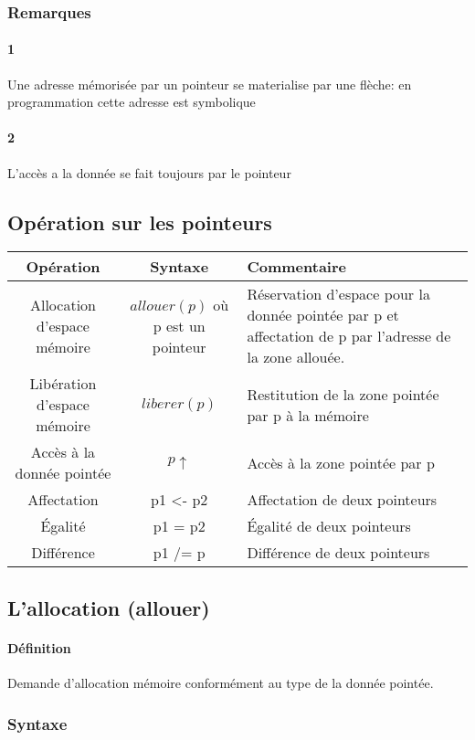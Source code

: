 		\subsubsection{Remarques}
			\paragraph{1}Une adresse mémorisée par un pointeur se materialise par une flèche: en programmation cette adresse est symbolique
			\paragraph{2}L'accès a la donnée se fait toujours par le pointeur		
	\subsection{Opération sur les pointeurs}
		\begin{tabular}{|c|c|p{6cm}|}
			\hline
				\textbf{Opération} & \textbf{Syntaxe} & \textbf{Commentaire} \\
			\hline
				Allocation d'espace mémoire & $allouer(p)$ où p est un pointeur & Réservation d'espace pour la donnée pointée par p et affectation de p par l'adresse de la zone allouée.\\
			\hline
				Libération d'espace mémoire & $liberer(p)$ & Restitution de la zone pointée par p à la mémoire\\
			\hline 
				Accès à la donnée pointée & $p\uparrow$ & Accès à la zone pointée par p\\
			\hline
				Affectation & p1 <- p2 & Affectation de deux pointeurs \\
			\hline
				Égalité & p1 = p2 & Égalité de deux pointeurs \\
			\hline
			Différence & p1 /= p & Différence de deux pointeurs \\
		\hline
	\end{tabular}
\subsection{L'allocation (allouer)}
	\paragraph{Définition}
		Demande d'allocation mémoire conformément au type de la donnée pointée.
	\subsubsection{Syntaxe}
		
		

